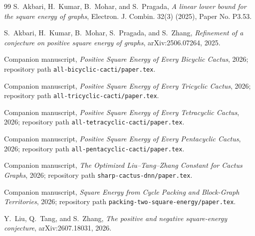 \documentclass[11pt]{article}
\begin{document}
\begin{thebibliography}{99}
S.~Akbari, H.~Kumar, B.~Mohar, and S.~Pragada,
\emph{A linear lower bound for the square energy of graphs},
Electron. J. Combin. 32(3) (2025), Paper No. P3.53.

S.~Akbari, H.~Kumar, B.~Mohar, S.~Pragada, and S.~Zhang,
\emph{Refinement of a conjecture on positive square energy of graphs},
arXiv:2506.07264, 2025.

Companion manuscript, \emph{Positive Square Energy of Every Bicyclic Cactus},
2026; repository path \texttt{all-bicyclic-cacti/paper.tex}.

Companion manuscript, \emph{Positive Square Energy of Every Tricyclic Cactus},
2026; repository path \texttt{all-tricyclic-cacti/paper.tex}.

Companion manuscript, \emph{Positive Square Energy of Every Tetracyclic
Cactus}, 2026; repository path \texttt{all-tetracyclic-cacti/paper.tex}.

Companion manuscript, \emph{Positive Square Energy of Every Pentacyclic
Cactus}, 2026; repository path \texttt{all-pentacyclic-cacti/paper.tex}.

Companion manuscript, \emph{The Optimized Liu--Tang--Zhang Constant for Cactus
Graphs}, 2026; repository path \texttt{sharp-cactus-dnn/paper.tex}.

Companion manuscript, \emph{Square Energy from Cycle Packing and Block-Graph
Territories}, 2026; repository path
\texttt{packing-two-square-energy/paper.tex}.

Y.~Liu, Q.~Tang, and S.~Zhang,
\emph{The positive and negative square-energy conjecture},
arXiv:2607.18031, 2026.
\end{thebibliography}
\end{document}
